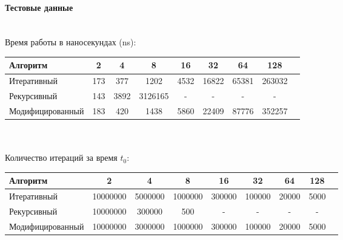 \documentclass[utf8x, 12pt]{G7-32} %
\begin{document}
\newpage

\paragraph{Тестовые данные}\\

Время работы в наносекундах (ns):\\

\begin{tabular}{l*{7}{c}r}
	Алгоритм & 2 & 4 & 8 & 16 & 32 & 64 & 128 \\
	\hline
	Итеративный & 173 & 377 & 1202 & 4532 & 16822 & 65381 & 263032 \\
	Рекурсивный & 143 & 3892 & 3126165 & - &  - & - & - \\
	Модифицированный & 183 & 420 & 1438 & 5860 & 22409 & 87776 & 352257 \\
\end{tabular}\\\\

Количество итераций за время $t_0$:\\

\begin{tabular}{l*{7}{c}r}
	Алгоритм & 2 & 4 & 8 & 16 & 32 & 64 & 128 \\
	\hline
	Итеративный & 10000000 & 5000000 & 1000000 & 300000 & 100000 & 20000 & 5000 \\
	Рекурсивный & 10000000 & 300000 & 500 & - &  - & - & - \\
	Модифицированный & 10000000 & 3000000  & 1000000 & 300000 & 100000 & 20000 & 5000 \\
\end{tabular}

\newpage
\end{document}
